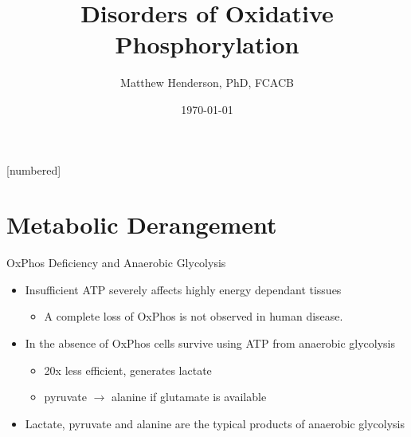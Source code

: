 \documentclass[presentation, smaller]{beamer}
\author{Matthew Henderson, PhD, FCACB}
\date{\today}
\title{Disorders of Oxidative Phosphorylation}
\institute[NSO]{Newborn Screening Ontario | The University of Ottawa}
\begin{document}
\maketitle


\vspace{220pt}
\beamertemplatenavigationsymbolsempty
{}[numbered]

\section{Metabolic Derangement}
\label{sec:orgfd75015}
\begin{frame}[label={sec:org7a43798}]{OxPhos Deficiency and Anaerobic Glycolysis}
\begin{itemize}
\item Insufficient ATP severely affects highly energy dependant tissues
\begin{itemize}
\item A complete loss of OxPhos is not observed in human disease.
\end{itemize}
\item In the absence of OxPhos cells survive using ATP from anaerobic glycolysis
\begin{itemize}
\item 20x less efficient, generates lactate
\item pyruvate \(\to\) alanine if glutamate is available
\end{itemize}
\item Lactate, pyruvate and alanine are the typical products of anaerobic glycolysis
\end{itemize}
\end{frame}
\end{document}

